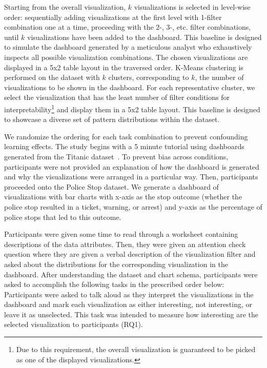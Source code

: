 \stitle{\BFS:} Starting from the overall visualization, $k$ visualizations is selected in level-wise order: sequentially adding visualizations at the first level with 1-filter combination one at a time, proceeding with the 2-, 3-, etc. filter combinations, until $k$ visualizations have been added to the dashboard. This baseline is designed to simulate the dashboard generated by a meticulous analyst who exhaustively inspects all possible visualization combinations. The chosen visualizations are displayed in a 5x2 table layout in the traversed order.
\stitle{\cluster:} K-Means clustering is performed on the dataset with $k$ clusters, corresponding to $k$, the number of visualizations to be shown in the dashboard. For each representative cluster, we select the visualization that has the least number of filter conditions for interpretability\footnote{Due to this requirement, the overall visualization is guaranteed to be picked as one of the displayed visualizations.} and display them in a 5x2 table layout. This baseline is designed to showcase a diverse set of pattern distributions within the dataset.

\par We randomize the ordering for each task combination to prevent confounding learning effects. The study begins with a 5 minute tutorial using dashboards generated from the Titanic dataset~\cite{titanic}. To prevent bias across conditions, participants were not provided an explanation of how the dashboard is generated and why the visualizations were arranged in a particular way. Then, participants proceeded onto the Police Stop dataset.%
We generate a dashboard of visualizations with bar charts with x-axis as the stop outcome (whether the police stop resulted in a ticket, warning, or arrest) and y-axis as the percentage of police stops that led to this outcome. 
\par Participants were given some time to read through a worksheet containing descriptions of the data attributes. Then, they were given an attention check question where they are given a verbal description of the visualization filter and asked about the distributions for the corresponding visualization in the dashboard. After understanding the dataset and chart schema, participants were asked to accomplish the following tasks in the prescribed order below:
 Participants were asked to talk aloud as they interpret the visualizations in the dashboard and mark each visualization as either interesting, not interesting, or leave it as unselected. This task was intended to measure how interesting are the selected visualization to participants (RQ1).%

